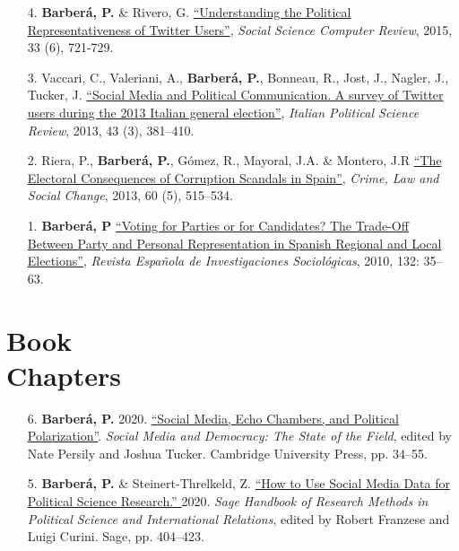 \documentclass[margin,line,11pt]{resume}
\begin{document}
\begin{resume}
\begin{itemize}[leftmargin=5.5mm]
\item[4.] \textbf{Barber\'{a}, P.} \& Rivero, G. \href{http://ssc.sagepub.com/content/33/6/712}{``Understanding the Political Representativeness of Twitter Users''}, \textit{Social Science Computer Review}, 2015, 33 (6), 721-729.

\item[3.] Vaccari, C., Valeriani, A., \textbf{Barber\'{a}, P.}, Bonneau, R., Jost, J., Nagler, J., Tucker, J. \href{http://www.rivisteweb.it/doi/10.1426/75245}{``Social Media and Political Communication. A survey of Twitter users during the 2013 Italian general election''}, \emph{Italian Political Science Review}, 2013, 43 (3), 381--410.

\item[2.] Riera, P., \textbf{Barber\'{a}, P.}, G\'{o}mez, R., Mayoral, J.A. \& Montero, J.R \href{http://link.springer.com/article/10.1007/s10611-013-9479-1}{``The Electoral Consequences of Corruption Scandals in Spain''}, \emph{Crime, Law and Social Change}, 2013, 60 (5), 515--534.

\item[1.] \textbf{Barber\'{a}, P} \href{http://www.reis.cis.es/REIS/PDF/REIS_132_021285919804928.pdf}{``Voting for Parties or for Candidates? The Trade-Off Between Party and Personal Representation in Spanish Regional and Local Elections''}, \emph{Revista Espa\~{n}ola de Investigaciones Sociol\'{o}gicas}, 2010, 132: 35--63.

\end{itemize}    



\section{\mysidestyle Book\\Chapters} 
\vspace{.15cm}    
\begin{itemize}[leftmargin=5.5mm]
\item[6.] \textbf{Barber\'{a}, P.} 2020. \href{http://www.pablobarbera.com/static/echo-chambers.pdf}{``Social Media, Echo Chambers, and Political Polarization''}. \textit{Social Media and Democracy: The State of the Field}, edited by Nate Persily and Joshua Tucker. Cambridge University Press, pp. 34--55.

\item[5.] \textbf{Barber\'{a}, P.} \& Steinert-Threlkeld, Z. \href{http://www.pablobarbera.com/static/social-media-data-generators.pdf}{``How to Use Social Media Data for Political Science Research.'' } 2020. \textit{Sage Handbook of Research Methods in Political Science and International Relations}, edited by Robert Franzese and Luigi Curini. Sage, pp. 404--423.


\end{itemize}
\end{resume}
\end{document}
